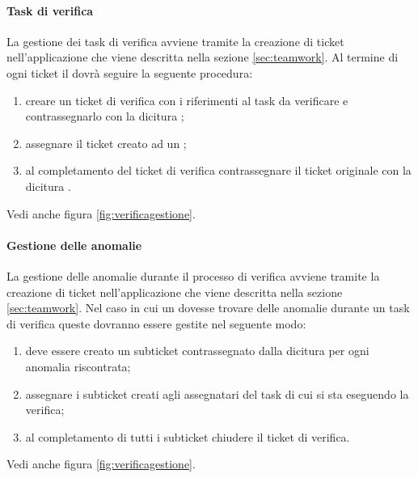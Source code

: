            \paragraph{Task di verifica}\label{sec:taskverifica}
            La gestione dei task di verifica avviene tramite la creazione di ticket nell'applicazione  che viene descritta nella sezione \ref{sec:teamwork}. Al termine di ogni ticket il \responsabilediprogetto{} dovrà seguire la seguente procedura:
            \begin{enumerate}
                \item creare un ticket di verifica con i riferimenti al task da verificare e contrassegnarlo con la dicitura \cit{[VERIFICA]};
                \item assegnare il ticket creato ad un \verificatore;
                \item al completamento del ticket di verifica contrassegnare il ticket originale con la dicitura \cit{[VERIFICATO]}.
            \end{enumerate}
            Vedi anche figura \ref{fig:verificagestione}.

            \paragraph{Gestione delle anomalie}\label{sec:gestioneanomalie}
            La gestione delle anomalie durante il processo di verifica avviene tramite la creazione di ticket nell'applicazione  che viene descritta nella sezione \ref{sec:teamwork}. Nel caso in cui un \verificatore{} dovesse trovare delle anomalie durante un task di verifica queste dovranno essere gestite nel seguente modo:
            \begin{enumerate}
                \item deve essere creato un subticket contrassegnato dalla dicitura \cit{[BUG]} per ogni anomalia riscontrata;
                \item assegnare i subticket creati agli assegnatari del task di cui si sta eseguendo la verifica;
                \item al completamento di tutti i subticket chiudere il ticket di verifica.
            \end{enumerate}
            Vedi anche figura \ref{fig:verificagestione}.

